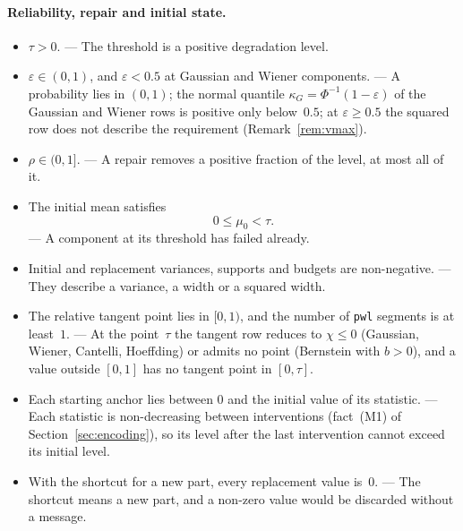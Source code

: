 \documentclass[11pt,a4paper]{article}
\theoremstyle{plain}
\theoremstyle{definition}
\theoremstyle{remark}
\begin{document}
\paragraph{Reliability, repair and initial state.}
\begin{itemize}
  \item $\tau > 0$. --- The threshold is a positive degradation level.
  \item $\varepsilon \in (0, 1)$, and $\varepsilon < 0.5$ at Gaussian and Wiener components. --- A probability lies in $(0,1)$; the normal quantile $\kappa_G = \Phi^{-1}(1-\varepsilon)$ of the Gaussian and Wiener rows is positive only below~$0.5$; at $\varepsilon \ge 0.5$ the squared row does not describe the requirement (Remark~\ref{rem:vmax}).
  \item $\rho \in (0, 1]$. --- A repair removes a positive fraction of the level, at most all of it.
  \item The initial mean satisfies
    \begin{equation}
      0 \le \mu_0 < \tau.
    \end{equation}
    --- A component at its threshold has failed already.
  \item Initial and replacement variances, supports and budgets are non-negative. --- They describe a variance, a width or a squared width.
  \item The relative tangent point lies in $[0, 1)$, and the number of \texttt{pwl} segments is at least~$1$. --- At the point~$\tau$ the tangent row reduces to $\chi \le 0$ (Gaussian, Wiener, Cantelli, Hoeffding) or admits no point (Bernstein with $b > 0$), and a value outside $[0,1]$ has no tangent point in $[0, \tau]$.
  \item Each starting anchor lies between $0$ and the initial value of its statistic. --- Each statistic is non-decreasing between interventions (fact~(M1) of Section~\ref{sec:encoding}), so its level after the last intervention cannot exceed its initial level.
  \item With the shortcut for a new part, every replacement value is~$0$. --- The shortcut means a new part, and a non-zero value would be discarded without a message.
\end{itemize}
\end{document}
